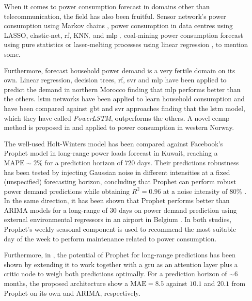 When it comes to power consumption forecast in domains other than telecommunication, the field has also been fruitful. Sensor network's power consumption using Markov chains \cite{achir2004power}, power consumption in data centres using LASSO, elastic-net, \ac{rf}, KNN, and \ac{mlp} \cite{deepika2020power}, coal-mining power consumption forecast using pure statistics \cite{antonenkov2017mathematic} or laser-melting processes using linear regression \cite{lv2020novel}, to mention some.  

Furthermore, forecast household power demand is a very fertile domain on its own. Linear regression, decision trees, \ac{rf}, \ac{svr} and \ac{mlp} have been applied to predict the demand in northern Morocco \cite{morocco} finding that \ac{mlp} performs better than the others. \ac{lstm} networks have been applied to learn household consumption and have been compared against \ac{gbt} and \ac{svr} approaches finding that the \ac{lstm} model, which they have called \emph{PowerLSTM}, outperforms the others\cite{powerlstm}. A novel \ac{eennp} method is proposed in \cite{ai2019household} and applied to power consumption in western Norway. 

The well-used Holt-Winters model has been compared against Facebook's Prophet model in long-range power loads forecast in Kuwait, reaching a $\text{MAPE}\sim2\%$ for a prediction horizon of 720 days. Their predictions robustness has been tested by injecting Gaussian noise in different intensities at a fixed (unspecified) forecasting horizon, concluding that Prophet can perform robust power demand predictions while obtaining $R^2=0.96$ at a noise intensity of $80\%$ \cite{almazrouee2020long}. In the same direction, it has been shown that Prophet performs better than ARIMA models for a long-range of 30 days on power demand prediction using external environmental regressors in an airport in Belgium \cite{chadalavada2020electricity}. In both studies, Prophet's weekly seasonal component is used to recommend the most suitable day of the week to perform maintenance related to power consumption.  

Furthermore, in \cite{jiang2021clothing}, the potential of Prophet for long-range predictions has been shown by extending it to work together with a \ac{gru} as an attention layer plus a \ac{critic} node to weigh both predictions optimally. For a prediction horizon of $\sim6$ months, the proposed architecture show a $\text{MAE}=8.5$ against $10.1$ and $20.1$ from Prophet on its own and ARIMA, respectively.  

